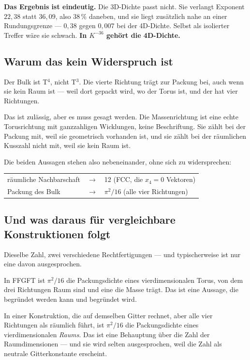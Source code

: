 \documentclass[11pt]{report}
\begin{document}
\textbf{Das Ergebnis ist eindeutig.} Die 3D-Dichte passt nicht. Sie
verlangt Exponent $22{,}38$ statt $36{,}09$, also $38\,\%$ daneben, und
sie liegt zusätzlich nahe an einer Rundungsgrenze --- $0{,}38$ gegen
$0{,}007$ bei der 4D-Dichte. Selbst als isolierter Treffer wäre sie
schwach. \textbf{In $K^{-36}$ gehört die 4D-Dichte.}

\subsection*{Warum das kein Widerspruch ist}

Der Bulk ist T$^4$, nicht T$^3$. Die vierte Richtung trägt zur Packung
bei, auch wenn sie kein Raum ist --- weil dort gepackt wird, wo der
Torus ist, und der hat vier Richtungen.

Das ist zulässig, aber es muss gesagt werden. Die Massenrichtung ist
eine echte Torusrichtung mit ganzzahligen Wicklungen, keine
Beschriftung. Sie zählt bei der Packung mit, weil sie geometrisch
vorhanden ist, und sie zählt bei der räumlichen Kusszahl nicht mit,
weil sie kein Raum ist.

Die beiden Aussagen stehen also nebeneinander, ohne sich zu
widersprechen:
\begin{center}
\begin{tabular}{lcl}
räumliche Nachbarschaft & $\longrightarrow$ & 12 (FCC, die $x_4 = 0$ Vektoren) \\
Packung des Bulk & $\longrightarrow$ & $\pi^2/16$ (alle vier Richtungen) \\
\end{tabular}
\end{center}

\subsection*{Und was daraus für vergleichbare Konstruktionen folgt}

Dieselbe Zahl, zwei verschiedene Rechtfertigungen --- und
typischerweise ist nur eine davon ausgesprochen.

In FFGFT ist $\pi^2/16$ die Packungsdichte eines vierdimensionalen
Torus, von dem drei Richtungen Raum sind und eine die Masse trägt. Das
ist eine Aussage, die begründet werden kann und begründet wird.

In einer Konstruktion, die auf demselben Gitter rechnet, aber alle vier
Richtungen als räumlich führt, ist $\pi^2/16$ die Packungsdichte eines
vierdimensionalen \emph{Raums}. Das ist eine Behauptung über die Zahl
der Raumdimensionen --- und sie wird selten ausgesprochen, weil die
Zahl als neutrale Gitterkonstante erscheint.
\end{document}
